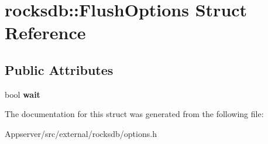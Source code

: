 \hypertarget{structrocksdb_1_1FlushOptions}{}\section{rocksdb\+:\+:Flush\+Options Struct Reference}
\label{structrocksdb_1_1FlushOptions}
\subsection*{Public Attributes}
\begin{DoxyCompactItemize}
\item 
bool {\bfseries wait}\hypertarget{structrocksdb_1_1FlushOptions_af97da606e667aa0b4db459515c00ec3b}{}\label{structrocksdb_1_1FlushOptions_af97da606e667aa0b4db459515c00ec3b}

\end{DoxyCompactItemize}


The documentation for this struct was generated from the following file\+:\begin{DoxyCompactItemize}
\item 
Appserver/src/external/rocksdb/options.\+h\end{DoxyCompactItemize}
